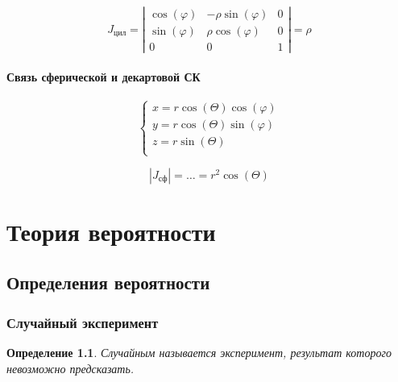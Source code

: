 \documentclass[a4paper, 14pt]{report}
\newtheorem{defenition}{Определение}[section]
\begin{document}
$$
J_\text{цил} = \left|
\begin{matrix}
    \cos(\varphi) & -\rho \sin(\varphi) & 0 \\
    \sin(\varphi) & \rho \cos(\varphi) & 0 \\
    0 & 0 & 1
\end{matrix}
\right| = \rho
$$

\subsubsection{Связь сферической и декартовой СК}

$$
\begin{cases}
    x = r \cos(\Theta) \cos(\varphi) \\
    y = r \cos(\Theta) \sin(\varphi) \\
    z = r \sin(\Theta) \\
\end{cases}
$$

$$
|J_\text{сф}| = \dots = r^2 \cos(\Theta)
$$

\chapter{Теория вероятности}

\section{Определения вероятности}

\subsection{Случайный эксперимент}

\begin{defenition}
    Случайным называется эксперимент, результат которого невозможно предсказать.
\end{defenition}
\end{document}
